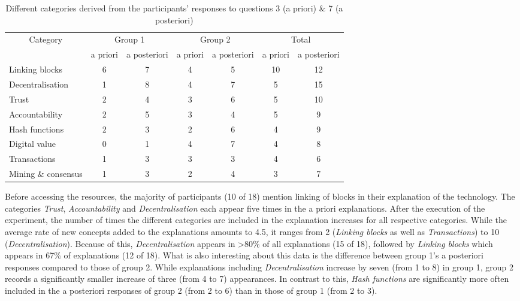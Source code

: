\begin{table}[]
    \centering
    \begin{tabular}{l|cc|cc|cc}
    \multicolumn{1}{c}{Category}      & \multicolumn{2}{c}{Group 1} & \multicolumn{2}{c}{Group 2} & \multicolumn{2}{c}{Total} \\
          & a priori   & a posteriori  & a priori   & a posteriori   & a priori  & a posteriori  \\
        \hline
Linking blocks      &   6       &        7       &     4       &      5          &    10      &       12      \\
Decentralisation    &   1       &        8       &     4       &       7         &     5      &      15       \\
Trust               &   2       &        4       &     3      &       6         &     5       &      10        \\
Accountability      &   2       &        5       &     3       &       4         &     5      &      9        \\
Hash functions      &   2       &        3        &     2       &   6         &     4         &      9       \\
Digital value       &   0       &        1       &      4      &         7       &     4      &      8        \\
Transactions        &   1       &        3       &     3       &     3        &     4         &       6      \\
Mining \& consensus &   1       &        3       &      2      &       4       &     3        &      7        \\
\end{tabular}
    \caption{Different categories derived from the participants' responses to questions 3 (a priori) \& 7 (a posteriori)}
    \label{tab:responses3+7}
\end{table}


Before accessing the resources, the majority of participants (10 of 18) mention linking of blocks in their explanation of the technology. The categories \textit{Trust}, \textit{Accountability} and \textit{Decentralisation} each appear five times in the a priori explanations. After the execution of the experiment, the number of times the different categories are included in the explanation increases for all respective categories. While the average rate of new concepts added to the explanations amounts to 4.5, it ranges from 2 (\textit{Linking blocks} as well as \textit{Transactions}) to 10 (\textit{Decentralisation}). Because of this, \textit{Decentralisation} appears in >80\% of all explanations (15 of 18), followed by \textit{Linking blocks} which appears in 67\% of explanations (12 of 18).
What is also interesting about this data is the difference between group 1's a posteriori responses compared to those of group 2. While explanations including \textit{Decentralisation} increase by seven (from 1 to 8) in group 1, group 2 records a significantly smaller increase of three (from 4 to 7) appearances. In contrast to this, \textit{Hash functions} are significantly more often included in the a posteriori responses of group 2 (from 2 to 6) than in those of group 1 (from 2 to 3). 

